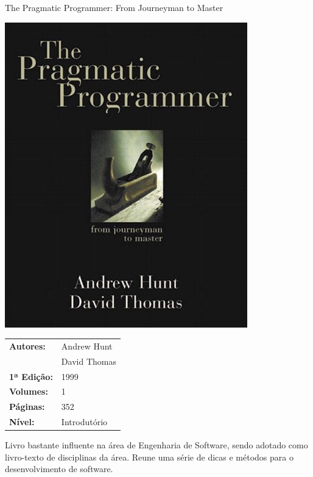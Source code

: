 \begin{frame}[fragile]{The Pragmatic Programmer: From Journeyman to Master}

    \begin{minipage}{0.4\textwidth}
        \includegraphics[scale=0.25]{hunt.jpg}
    \end{minipage}
    \begin{minipage}{0.5\textwidth}
        \begin{small}
            \begin{tabularx}{0.95\textwidth}{lX}
                \textbf{Autores:} & Andrew Hunt \\
                & David Thomas \\
                \textbf{1ª Edição:} & 1999 \\
                \textbf{Volumes:} & 1 \\
                \textbf{Páginas:} & 352 \\
                \textbf{Nível:} & Introdutório \\
            \end{tabularx}
        \end{small}
    \end{minipage}

    \vspace{0.2in} 

    Livro bastante influente na área de Engenharia de Software, sendo adotado como livro-texto
    de disciplinas da área. Reune uma série de dicas e métodos para o desenvolvimento de
    software.

\end{frame}

